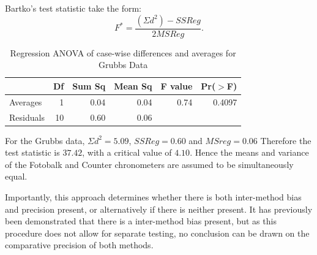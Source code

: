 \documentclass[12pt, a4paper]{report}
\theoremstyle{plain}
\theoremstyle{definition}
\theoremstyle{remark}
\begin{document}
Bartko's test statistic take the form:
\[ F^{\ast} = \frac{(\Sigma d^{2})-SSReg}{2MSReg}.
\]
\begin{table}[ht]
	\begin{center}
		\begin{tabular}{lrrrrr}
			\hline
			& Df & Sum Sq & Mean Sq & F value & Pr($>$F) \\
			\hline
			Averages & 1 & 0.04 & 0.04 & 0.74 & 0.4097 \\
			Residuals & 10 & 0.60 & 0.06 &  &  \\
			\hline
		\end{tabular}
		\caption{Regression ANOVA of case-wise differences and averages
			for Grubbs Data}
	\end{center}
\end{table}
For the Grubbs data, $\Sigma d^{2}=5.09 $, $SSReg = 0.60$ and
$MSreg=0.06$ Therefore the test statistic is $37.42$, with a
critical value of $4.10$. Hence the means and variance of the
Fotobalk and Counter chronometers are assumed to be simultaneously
equal.

Importantly, this approach determines whether there is both
inter-method bias and precision present, or alternatively if there
is neither present. It has previously been demonstrated that there
is a inter-method bias present, but as this procedure does not
allow for separate testing, no conclusion can be drawn on the
comparative precision of both methods.





 



\end{document}
